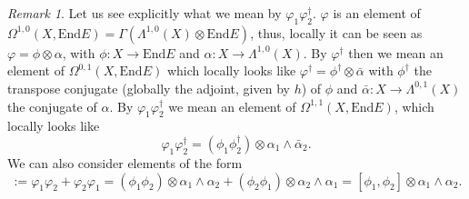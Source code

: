 \documentclass[12pt,a4paper]{book}
\theoremstyle{definition} \newtheorem{defn}[thm]{Definition}
\theoremstyle{definition} \newtheorem{ejemplo}[thm]{Example}
\theoremstyle{remark} \newtheorem{rem}[thm]{Remark}
\def\End{\mathrm{End}}
\begin{document}
	  \begin{rem}\label{obsproducto}
	    Let us see explicitly what we mean by $\varphi_1\varphi_2^\dagger$. $\varphi$ is an element of $\Omega^{1,0}(X,\End E)=\Gamma(\Lambda^{1,0}(X)\otimes\End E)$, thus, locally it can be seen as $\varphi=\phi \otimes \alpha$, with $\phi: X \rightarrow \End E$ and $\alpha:X\rightarrow \Lambda^{1,0}(X)$. By $\varphi^\dagger$ then we mean an element of $\Omega^{0,1}(X,\End E)$ which locally looks like $\varphi^\dagger=\phi^{\dagger} \otimes \bar{\alpha}$ with $\phi^{\dagger}$ the transpose conjugate (globally the adjoint, given by $h$) of $\phi$ and $\bar{\alpha}:X\rightarrow \Lambda^{0,1}(X)$ the conjugate of $\alpha$. By $\varphi_1 \varphi_2^\dagger$ we mean an element of $\Omega^{1,1}(X,\End E)$, which locally looks like
	    \begin{equation*}
	      \varphi_1 \varphi_2^\dagger=(\phi_1\phi_2^{\dagger})\otimes \alpha_1 \wedge \bar{\alpha}_2.
	    \end{equation*}
	    We can also consider elements of the form
	    \begin{equation*}
	      [\varphi_1, \varphi_2] := \varphi_1 \varphi_2 + \varphi_2 \varphi_1 = (\phi_1\phi_2)\otimes \alpha_1 \wedge \alpha_2 + (\phi_2 \phi_1) \otimes \alpha_2 \wedge \alpha_1=[\phi_1,\phi_2] \otimes \alpha_1 \wedge \alpha_2.
	    \end{equation*}
	  \end{rem}
	  
\end{document}
